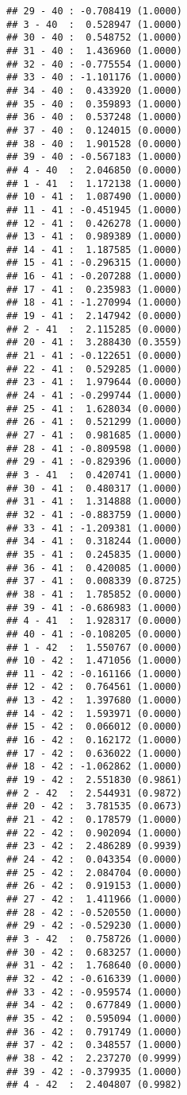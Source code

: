\documentclass[12pt,]{article}
\begin{document}
\begin{verbatim}
## 29 - 40 : -0.708419 (1.0000)
## 3 - 40  :  0.528947 (1.0000)
## 30 - 40 :  0.548752 (1.0000)
## 31 - 40 :  1.436960 (1.0000)
## 32 - 40 : -0.775554 (1.0000)
## 33 - 40 : -1.101176 (1.0000)
## 34 - 40 :  0.433920 (1.0000)
## 35 - 40 :  0.359893 (1.0000)
## 36 - 40 :  0.537248 (1.0000)
## 37 - 40 :  0.124015 (0.0000)
## 38 - 40 :  1.901528 (0.0000)
## 39 - 40 : -0.567183 (1.0000)
## 4 - 40  :  2.046850 (0.0000)
## 1 - 41  :  1.172138 (1.0000)
## 10 - 41 :  1.087490 (1.0000)
## 11 - 41 : -0.451945 (1.0000)
## 12 - 41 :  0.426278 (1.0000)
## 13 - 41 :  0.989389 (1.0000)
## 14 - 41 :  1.187585 (1.0000)
## 15 - 41 : -0.296315 (1.0000)
## 16 - 41 : -0.207288 (1.0000)
## 17 - 41 :  0.235983 (1.0000)
## 18 - 41 : -1.270994 (1.0000)
## 19 - 41 :  2.147942 (0.0000)
## 2 - 41  :  2.115285 (0.0000)
## 20 - 41 :  3.288430 (0.3559)
## 21 - 41 : -0.122651 (0.0000)
## 22 - 41 :  0.529285 (1.0000)
## 23 - 41 :  1.979644 (0.0000)
## 24 - 41 : -0.299744 (1.0000)
## 25 - 41 :  1.628034 (0.0000)
## 26 - 41 :  0.521299 (1.0000)
## 27 - 41 :  0.981685 (1.0000)
## 28 - 41 : -0.809598 (1.0000)
## 29 - 41 : -0.829396 (1.0000)
## 3 - 41  :  0.420741 (1.0000)
## 30 - 41 :  0.480317 (1.0000)
## 31 - 41 :  1.314888 (1.0000)
## 32 - 41 : -0.883759 (1.0000)
## 33 - 41 : -1.209381 (1.0000)
## 34 - 41 :  0.318244 (1.0000)
## 35 - 41 :  0.245835 (1.0000)
## 36 - 41 :  0.420085 (1.0000)
## 37 - 41 :  0.008339 (0.8725)
## 38 - 41 :  1.785852 (0.0000)
## 39 - 41 : -0.686983 (1.0000)
## 4 - 41  :  1.928317 (0.0000)
## 40 - 41 : -0.108205 (0.0000)
## 1 - 42  :  1.550767 (0.0000)
## 10 - 42 :  1.471056 (1.0000)
## 11 - 42 : -0.161166 (1.0000)
## 12 - 42 :  0.764561 (1.0000)
## 13 - 42 :  1.397680 (1.0000)
## 14 - 42 :  1.593971 (0.0000)
## 15 - 42 :  0.066012 (0.0000)
## 16 - 42 :  0.162172 (1.0000)
## 17 - 42 :  0.636022 (1.0000)
## 18 - 42 : -1.062862 (1.0000)
## 19 - 42 :  2.551830 (0.9861)
## 2 - 42  :  2.544931 (0.9872)
## 20 - 42 :  3.781535 (0.0673)
## 21 - 42 :  0.178579 (1.0000)
## 22 - 42 :  0.902094 (1.0000)
## 23 - 42 :  2.486289 (0.9939)
## 24 - 42 :  0.043354 (0.0000)
## 25 - 42 :  2.084704 (0.0000)
## 26 - 42 :  0.919153 (1.0000)
## 27 - 42 :  1.411966 (1.0000)
## 28 - 42 : -0.520550 (1.0000)
## 29 - 42 : -0.529230 (1.0000)
## 3 - 42  :  0.758726 (1.0000)
## 30 - 42 :  0.683257 (1.0000)
## 31 - 42 :  1.768640 (0.0000)
## 32 - 42 : -0.616339 (1.0000)
## 33 - 42 : -0.959574 (1.0000)
## 34 - 42 :  0.677849 (1.0000)
## 35 - 42 :  0.595094 (1.0000)
## 36 - 42 :  0.791749 (1.0000)
## 37 - 42 :  0.348557 (1.0000)
## 38 - 42 :  2.237270 (0.9999)
## 39 - 42 : -0.379935 (1.0000)
## 4 - 42  :  2.404807 (0.9982)

\end{verbatim}
\end{document}
